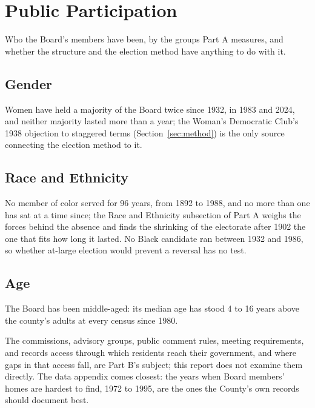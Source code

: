 \section{Public Participation}

Who the Board's members have been, by the groups Part A measures, and whether
the structure and the election method have anything to do with it.

\subsection{Gender}

Women have held a majority of the Board twice since 1932, in 1983 and 2024, and
neither majority lasted more than a year; the Woman's Democratic Club's 1938
objection to staggered terms (Section~\ref{sec:method}) is the only source
connecting the election method to it.

\subsection{Race and Ethnicity}

No member of color served for 96 years, from 1892 to 1988, and no more than one
has sat at a time since; the Race and Ethnicity subsection of Part A weighs the
forces behind the absence and finds the shrinking of the electorate after 1902
the one that fits how long it lasted. No Black candidate ran between 1932 and
1986, so whether at-large election would prevent a reversal has no test.

\subsection{Age}

The Board has been middle-aged: its median age has stood 4 to 16 years above
the county's adults at every census since 1980.

The commissions, advisory groups, public comment rules, meeting requirements,
and records access through which residents reach their government, and where
gaps in that access fall, are Part B's subject; this report does not examine
them directly. The data appendix comes closest: the years when Board members'
homes are hardest to find, 1972 to 1995, are the ones the County's own records
should document best.

